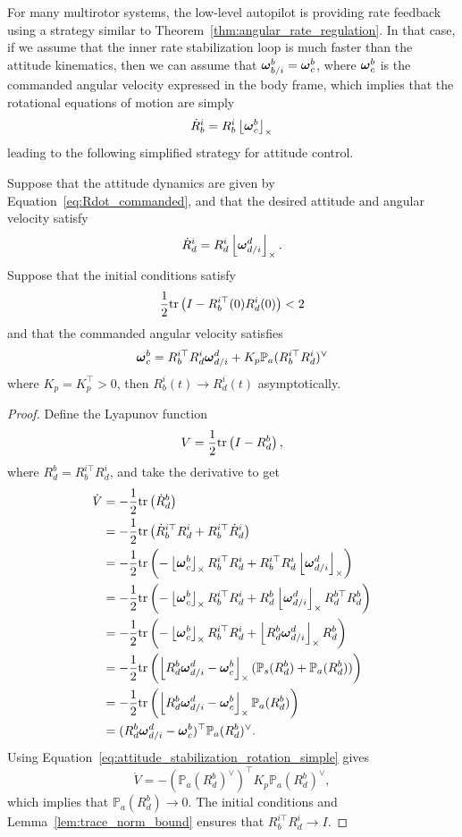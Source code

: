 For many multirotor systems, the low-level autopilot is providing rate feedback using a strategy similar to Theorem~\ref{thm:angular_rate_regulation}.  In that case, if we assume that the inner rate stabilization loop is much faster than the attitude kinematics, then we can assume that $\boldsymbol{\omega}_{b/i}^b = \boldsymbol{\omega}_c^b$, where $\boldsymbol{\omega}_c^b$ is the commanded angular velocity expressed in the body frame, which implies that the rotational equations of motion are simply
\begin{equation}\label{eq:Rdot_commanded}
\dot{R}_b^i = R_b^i \ss{\omegabf_c^b}
\end{equation}
leading to the following simplified strategy for attitude control.
\begin{theorem}\label{thm:attitude_stabilization_rotation_simple}
	Suppose that the attitude dynamics are given by Equation~\eqref{eq:Rdot_commanded}, and that the desired attitude and angular velocity satisfy
	\[
	\dot{R}_d^i = R_d^i \left\lfloor\boldsymbol{\omega}_{d/i}^d\right\rfloor_{\times}.
	\]
	Suppose that the initial conditions satisfy
	\[
	\frac{1}{2}\text{tr}\left(I-R_b^{i\top}(0)R_d^i(0)\right) < 2
	\]
	and that the commanded angular velocity satisfies
	\begin{equation}\label{eq:attitude_stabilization_rotation_simple}
		\omegabf_c^b = R_b^{i\top}R_d^i \omegabf_{d/i}^d + K_p \mathbb{P}_a(R_b^{i\top}R_d^i)^\vee
	\end{equation}
	where $K_p=K_p^\top >0$, then $R_b^i(t) \to R_d^i(t)$ asymptotically.
\end{theorem}
\begin{proof}
Define the Lyapunov function
\[
V = \frac{1}{2}\text{tr}\left(I-R_d^b\right),
\]
where $R_d^b=R_b^{i\top}R_d^i$,
and take the derivative to get
\begin{align*}
\dot{V} &= -\frac{1}{2}\text{tr}\left(\dot{R}_d^b\right) \\
	&= 	-\frac{1}{2}\text{tr}\left(\dot{R}_b^{i\top}R_d^i + R_b^{i\top}\dot{R}_d^i\right) \\
	&=  -\frac{1}{2}\text{tr}\left(-\left\lfloor\boldsymbol{\omega}_c^b\right\rfloor_{\times}R_b^{i\top}R_d^i + R_b^{i\top}R_d^i\left\lfloor\boldsymbol{\omega}_{d/i}^d\right\rfloor_{\times}\right) \\
	&=  -\frac{1}{2}\text{tr}\left(-\left\lfloor\boldsymbol{\omega}_c^b\right\rfloor_{\times}R_b^{i\top}R_d^i + R_d^b\left\lfloor\boldsymbol{\omega}_{d/i}^d\right\rfloor_{\times}R_d^{b\top}R_d^b\right) \\
	&=  -\frac{1}{2}\text{tr}\left(-\left\lfloor\boldsymbol{\omega}_c^b\right\rfloor_{\times}R_b^{i\top}R_d^i + \left\lfloor R_d^b\boldsymbol{\omega}_{d/i}^d\right\rfloor_{\times}R_d^b\right) \\
	&=  -\frac{1}{2}\text{tr}\left(\left\lfloor R_d^b\boldsymbol{\omega}_{d/i}^d-\boldsymbol{\omega}_c^b\right\rfloor_{\times}(\mathbb{P}_s(R_d^b)+\mathbb{P}_a(R_d^b))\right) \\
	&=  -\frac{1}{2}\text{tr}\left(\left\lfloor R_d^b\boldsymbol{\omega}_{d/i}^d-\boldsymbol{\omega}_c^b\right\rfloor_{\times}\mathbb{P}_a(R_d^b)\right) \\
	&=  (R_d^b\boldsymbol{\omega}_{d/i}^d-\boldsymbol{\omega}_c^b)^\top \mathbb{P}_a(R_d^b)^\vee.
\end{align*}
Using Equation~\eqref{eq:attitude_stabilization_rotation_simple} gives
\[
\dot{V} = -(\mathbb{P}_a(R_d^b)^\vee)^\top K_p \mathbb{P}_a(R_d^b)^\vee,
\]
which implies that $\mathbb{P}_a(R_d^b) \to 0$.  The initial conditions and Lemma~\ref{lem:trace_norm_bound} ensures that 
$R_b^{i\top}R_d^i \to I$.
\end{proof}

